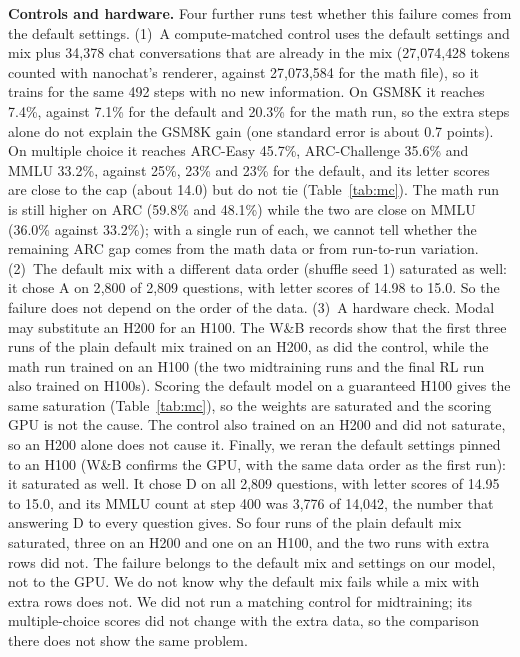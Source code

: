 \documentclass[10pt]{article}
\begin{document}
\textbf{Controls and hardware.} Four further runs test whether this failure comes from the default settings. (1)~A compute-matched control uses the default settings and mix plus 34{,}378 chat conversations that are already in the mix (27{,}074{,}428 tokens counted with nanochat's renderer, against 27{,}073{,}584 for the math file), so it trains for the same 492 steps with no new information. On GSM8K it reaches 7.4\%, against 7.1\% for the default and 20.3\% for the math run, so the extra steps alone do not explain the GSM8K gain (one standard error is about 0.7 points). On multiple choice it reaches ARC-Easy 45.7\%, ARC-Challenge 35.6\% and MMLU 33.2\%, against 25\%, 23\% and 23\% for the default, and its letter scores are close to the cap (about 14.0) but do not tie (Table~\ref{tab:mc}). The math run is still higher on ARC (59.8\% and 48.1\%) while the two are close on MMLU (36.0\% against 33.2\%); with a single run of each, we cannot tell whether the remaining ARC gap comes from the math data or from run-to-run variation. (2)~The default mix with a different data order (shuffle seed 1) saturated as well: it chose A on 2{,}800 of 2{,}809 questions, with letter scores of 14.98 to 15.0. So the failure does not depend on the order of the data. (3)~A hardware check. Modal may substitute an H200 for an H100. The W\&B records show that the first three runs of the plain default mix trained on an H200, as did the control, while the math run trained on an H100 (the two midtraining runs and the final RL run also trained on H100s). Scoring the default model on a guaranteed H100 gives the same saturation (Table~\ref{tab:mc}), so the weights are saturated and the scoring GPU is not the cause. The control also trained on an H200 and did not saturate, so an H200 alone does not cause it. Finally, we reran the default settings pinned to an H100 (W\&B confirms the GPU, with the same data order as the first run): it saturated as well. It chose D on all 2{,}809 questions, with letter scores of 14.95 to 15.0, and its MMLU count at step 400 was 3{,}776 of 14{,}042, the number that answering D to every question gives. So four runs of the plain default mix saturated, three on an H200 and one on an H100, and the two runs with extra rows did not. The failure belongs to the default mix and settings on our model, not to the GPU. We do not know why the default mix fails while a mix with extra rows does not. We did not run a matching control for midtraining; its multiple-choice scores did not change with the extra data, so the comparison there does not show the same problem.
\end{document}
